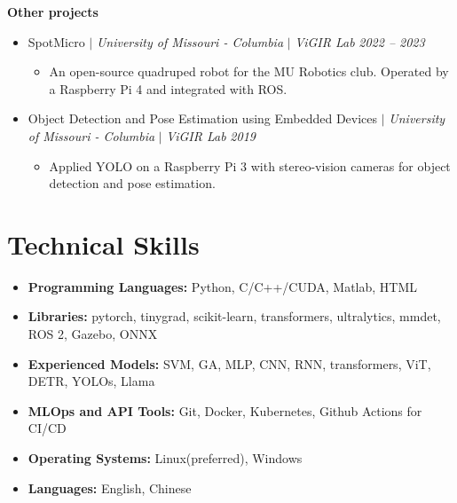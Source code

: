 \documentclass[letterpaper,10pt]{article}
\begin{document}
\textbf{Other projects}
\begin{itemize}[leftmargin=0.15in, parsep=0pt] 
  \item SpotMicro $|$ 
  \emph{University of Missouri - Columbia} $|$ 
  \emph{ViGIR Lab}
  \hfill\textit{2022 -- 2023}
  \begin{itemize}[leftmargin=0.15in, parsep=0pt]
    \item An open-source quadruped robot for the MU Robotics club. Operated by a Raspberry Pi 4 and integrated with ROS.
  \end{itemize}
  \item Object Detection and Pose Estimation using Embedded Devices $|$
   \emph{University of Missouri - Columbia} $|$ 
  \emph{ViGIR Lab}
  \hfill\textit{2019}
  \begin{itemize}[leftmargin=0.15in, parsep=0pt]
    \item Applied YOLO on a Raspberry Pi 3 with stereo-vision cameras for object detection and pose estimation.
  \end{itemize}
\end{itemize}


\nocite{*}
\printbibliography[title={Publications}]

\section{Technical Skills}
\begin{itemize}[leftmargin=0.15in, parsep=0pt, label={}]
  \item \textbf{Programming Languages: }{Python, C/C++/CUDA, Matlab, HTML}
  \item \textbf{Libraries: }{pytorch, tinygrad, scikit-learn, transformers, ultralytics, mmdet, ROS 2, Gazebo, ONNX}
  \item \textbf{Experienced Models: }{SVM, GA, MLP, CNN, RNN, transformers, ViT, DETR, YOLOs, Llama}
  \item \textbf{MLOps and API Tools: }{Git, Docker, Kubernetes, Github Actions for CI/CD}
  \item \textbf{Operating Systems: }{Linux(preferred), Windows}
  \item \textbf{Languages: }{English, Chinese}
\end{itemize}
\end{document}
